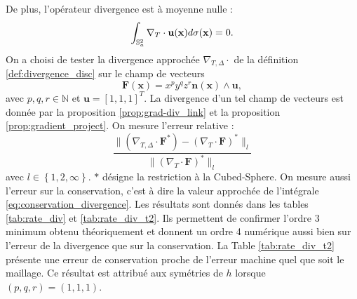 De plus, l'opérateur divergence est à moyenne nulle :
\begin{equation}
\displaystyle\int_{\mathbb{S}_a^2} \nabla_T \cdot \mathbf{u} ( \mathbf{x} ) d \sigma ( \mathbf{x} ) = 0.
\label{eq:conservation_divergence}
\end{equation}
On a choisi de tester la divergence approchée $\nabla_{T,\Delta} \cdot$ de la définition \ref{def:divergence_disc} sur le champ de vecteurs 
\begin{equation}
\mathbf{F}(\mathbf{x}) = x^p y^q z^r \mathbf{n}(\mathbf{x}) \wedge \mathbf{u},
\label{eq:test_divergence}
\end{equation}
avec $p,q,r \in \mathbb{N}$ et $\mathbf{u} = [1, 1, 1]^T$. La divergence d'un tel champ de vecteurs est donnée par la proposition \ref{prop:grad-div_link} et la proposition \ref{prop:gradient_project}. 
On mesure l'erreur relative : 
\begin{equation}
\dfrac{\| \left(\nabla_{T,\Delta} \cdot \mathbf{F}^* \right) - \left( \nabla_{T} \cdot \mathbf{F}\right)^* \|_l}{\| \left( \nabla_{T} \cdot \mathbf{F} \right)^* \|_l}
\end{equation}
avec $l \in \left\lbrace 1, 2, \infty \right\rbrace$. $*$ désigne la restriction à la Cubed-Sphere.
On mesure aussi l'erreur sur la conservation, c'est à dire la valeur approchée de l'intégrale \eqref{eq:conservation_divergence}. Les résultats sont donnés dans les tables \ref{tab:rate_div} et \ref{tab:rate_div_t2}. Ils permettent de confirmer l'ordre 3 minimum obtenu théoriquement et donnent un ordre 4 numérique aussi bien sur l'erreur de la divergence que sur la conservation. La Table \ref{tab:rate_div_t2} présente une erreur de conservation proche de l'erreur machine quel que soit le maillage. Ce résultat est attribué aux symétries de $h$ lorsque $(p,q,r)=(1,1,1)$. 
